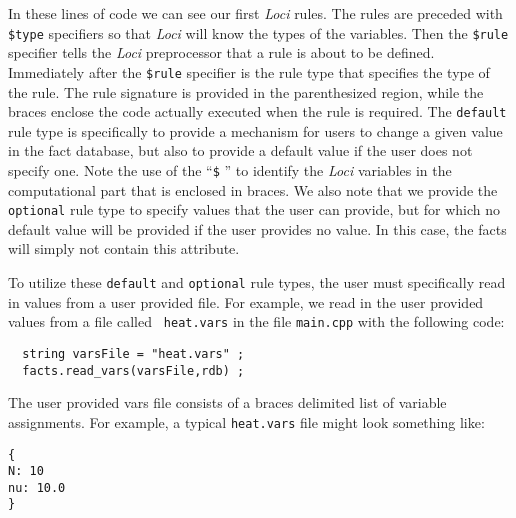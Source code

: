\documentclass[10pt,epsf,letterpaper,twoside]{book}
\begin{document}
In these lines of code we can see our first {\it Loci} rules.  The rules are
preceded with {\tt \$type} specifiers so that {\it Loci} will know the types
of the variables.  Then the {\tt \$rule} specifier tells the {\it Loci}
preprocessor that a rule is about to be defined.  Immediately after
the {\tt \$rule} specifier is the rule type that specifies the type of
the rule.  The rule signature is provided in the parenthesized region,
while the braces enclose the code actually executed when the rule is
required.  The {\tt default} rule type is specifically to provide a
mechanism for users to change a given value in the fact database, but
also to provide a default value if the user does not specify one.
Note the use of the ``{\tt \$} '' to identify the {\it Loci} variables in
the computational part that is enclosed in braces.  We also note that
we provide the {\tt optional} rule type to specify values that the
user can provide, but for which no default value will be provided if
the user provides no value.  In this case, the facts will simply not
contain this attribute. 

To utilize these {\tt default} and {\tt optional} rule types, the user
must specifically read in values from a user provided file.  For
example, we read in the user provided values from a file called {\tt
  heat.vars} in the file {\tt main.cpp} with the following code:

\begin{verbatim}
  string varsFile = "heat.vars" ;
  facts.read_vars(varsFile,rdb) ;
\end{verbatim}

The user provided vars file consists of a braces delimited list of
variable assignments.  For example, a typical {\tt heat.vars} file
might look something like:
\begin{verbatim}
{
N: 10
nu: 10.0
}
\end{verbatim}
\end{document}
